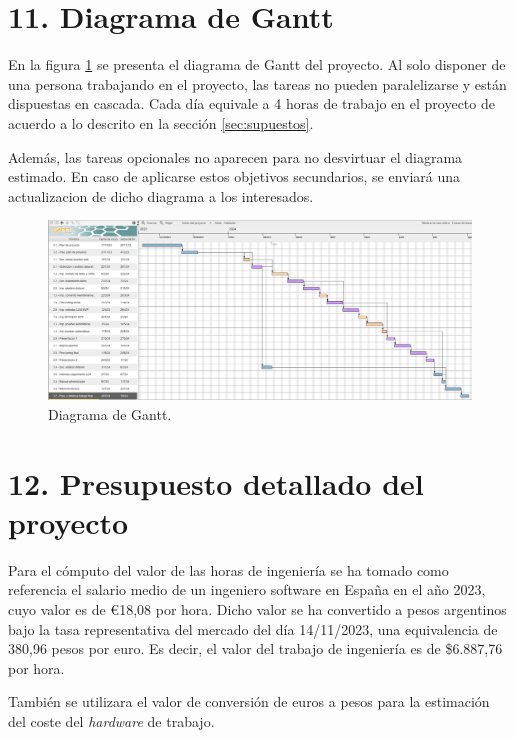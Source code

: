 \documentclass[
11pt, %
]{Clases/charter}
\begin{document}
\section{11. Diagrama de Gantt}
En la figura \ref{fig:diagGantt} se presenta el diagrama de Gantt del proyecto.
Al solo disponer de una persona trabajando en el proyecto, las tareas no pueden paralelizarse y están dispuestas en cascada.
Cada día equivale a 4 horas de trabajo en el proyecto de acuerdo a lo descrito en la sección \ref{sec:supuestos}.

Además, las tareas opcionales no aparecen para no desvirtuar el diagrama estimado.
En caso de aplicarse estos objetivos secundarios, se enviará una actualizacion de dicho diagrama a los interesados.

\label{sec:gantt}
\begin{landscape}
	\begin{figure}[htpb]
		\centering
		\includegraphics[height=.67\textheight]{./Figuras/Gantt-2.png}
		\caption{Diagrama de Gantt.}
		\label{fig:diagGantt}
	\end{figure}
\end{landscape}
\section{12. Presupuesto detallado del proyecto}
\label{sec:presupuesto}
Para el cómputo del valor de las horas de ingeniería se ha tomado como referencia el salario medio de un ingeniero software en España en el año 2023, cuyo valor es de \euro18,08 por hora.
Dicho valor se ha convertido a pesos argentinos bajo la tasa representativa del mercado del día 14/11/2023, una equivalencia de 380,96 pesos por euro.
Es decir, el valor del trabajo de ingeniería es de \$6.887,76 por hora.

También se utilizara el valor de conversión de euros a pesos para la estimación del coste del \textit{hardware} de trabajo.
\end{document}
